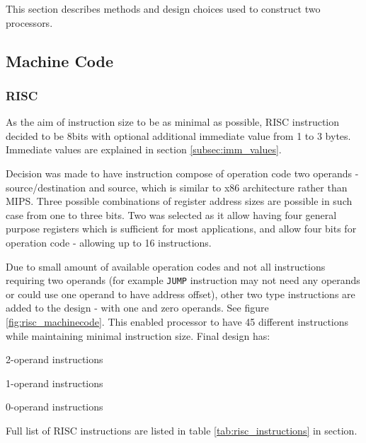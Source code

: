 This section describes methods and design choices used to construct two processors.

\subsection{Machine Code}\label{subsec:machine_code}

\subsubsection{RISC}
As the aim of instruction size to be as minimal as possible, RISC instruction decided to be 8bits with optional additional immediate value from 1 to 3 bytes. Immediate values are explained in section \ref{subsec:imm_values}.

Decision was made to have instruction compose of operation code two operands - source/destination and source, which is similar to x86 architecture rather than MIPS. Three possible combinations of register address sizes are possible in such case from one to three bits. Two was selected as it allow having four general purpose registers which is sufficient for most applications, and allow four bits for operation code - allowing up to 16 instructions. 

Due to small amount of available operation codes and not all instructions requiring two operands (for example \texttt{JUMP} instruction may not need any operands or could use one operand to have address offset), other two type instructions are added to the design - with one and zero operands. See figure \ref{fig:risc_machinecode}. This enabled processor to have 45 different instructions while maintaining minimal instruction size. Final design has:
\begin{description}[labelindent=1cm, labelsep=1em]
	\item[$\bullet$ \textbf{8 }]  2-operand instructions
	\item[$\bullet$ \textbf{32}]  1-operand instructions
	\item[$\bullet$ \textbf{5 }]  0-operand instructions
\end{description}
Full list of RISC instructions are listed in table \ref{tab:risc_instructions} in  section.

